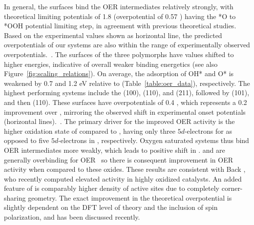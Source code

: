 %
In general, the \rIrOtwo surfaces bind the OER intermediates relatively strongly, with theoretical limiting potentials of \mytilde\num{1.8} \VRHE (overpotential of \num{0.57} \VRHE) having the *O to *OOH potential limiting step, in agreement with previous theoretical studies.~\cite{Briquet2017,Strickler2019,Raman2020}
%
Based on the experimental values shown as horizontal line, the predicted overpotentials of our \rIrOtwo systems are also within the range of experimentally observed overpotentials.~\cite{Seitz2016, Kuo2017}.
%
The surfaces of the three \IrOthree polymorphs have \DGOmOH{} values shifted to higher energies, indicative of overall weaker binding energetics (see also Figure~\ref{fig:scaling_relations}).
%
On average, the adsorption of OH* and O* is weakened by \num{0.7} and \num{1.2} eV relative to \IrOtwo (Table~\ref{table:oer_data}), respectively.
%
The highest performing systems include the \aIrOthree (100), (110), and (211), followed by \bIrOthree (101), and then \rIrOthree (110).
%
These surfaces have overpotentials of \mytilde\num{0.4} \VRHE,
which represents a \mytilde\num{0.2} \VRHE improvement over \rIrOtwo, mirroring the observed shift in experimental onset potentials (horizontal lines).~\cite{Seitz2016, Kuo2017}.
%
The primary driver for the improved OER activity is the higher oxidation state of \IrOthree compared to \IrOtwo, having only three $5d$-electrons for  as opposed to five $5d$-electrons in , respectively.
%
Oxygen saturated \IrOthree systems thus bind OER intermediates more weakly, which leads to positive shift in \DGOmOH{}.
%
\IrOtwo and \RhOtwo are generally overbinding for OER~\cite{Dickens2019} so there is consequent improvement in OER activity when compared to these oxides.
%
These results are consistent with Back , who recently computed elevated activity in highly oxidized \IrOthree catalysts.\cite{Back2019}
%
An added feature of \aIrOthree is comparably higher density of active sites due to completely corner-sharing geometry.
%
The exact improvement in the theoretical overpotential is slightly dependent on the DFT level of theory and the inclusion of spin polarization, and has been discussed recently.~\cite{Seitz2016,Strickler2019}

